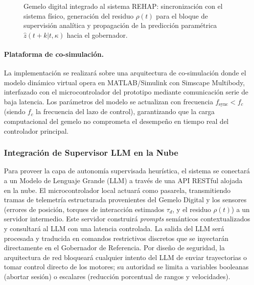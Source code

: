 \documentclass[a4paper,12pt]{article}
\begin{document}
\begin{figure}[H]
    \caption{Gemelo digital integrado al sistema REHAP: sincronización con el sistema físico, generación del residuo $\rho(t)$ para el bloque de supervisión analítica y propagación de la predicción paramétrica $\hat{z}(t+k|t, \kappa)$ hacia el gobernador.}
    \label{fig:dt}
\end{figure}

\paragraph{Plataforma de co-simulación.}
La implementación se realizará sobre una arquitectura de co-simulación donde el modelo dinámico virtual opera en MATLAB/Simulink con Simscape Multibody, interfazado con el microcontrolador del prototipo mediante comunicación serie de baja latencia. Los parámetros del modelo se actualizan con frecuencia $f_{\mathrm{sync}} < f_c$ (siendo $f_c$ la frecuencia del lazo de control), garantizando que la carga computacional del gemelo no comprometa el desempeño en tiempo real del controlador principal.

\subsubsection{Integración de Supervisor LLM en la Nube}

Para proveer la capa de autonomía supervisada heurística, el sistema se conectará a un Modelo de Lenguaje Grande (LLM) a través de una API RESTful alojada en la nube. El microcontrolador local actuará como pasarela, transmitiendo tramas de telemetría estructurada provenientes del Gemelo Digital y los sensores (errores de posición, torques de interacción estimados $\tau_d$, y el residuo $\rho(t)$) a un servidor intermedio. Este servidor construirá \textit{prompts} semánticos contextualizados y consultará al LLM con una latencia controlada. La salida del LLM será procesada y traducida en comandos restrictivos discretos que se inyectarán directamente en el Gobernador de Referencia. Por diseño de seguridad, la arquitectura de red bloqueará cualquier intento del LLM de enviar trayectorias o tomar control directo de los motores; su autoridad se limita a variables booleanas (abortar sesión) o escalares (reducción porcentual de rangos y velocidades).
\end{document}
